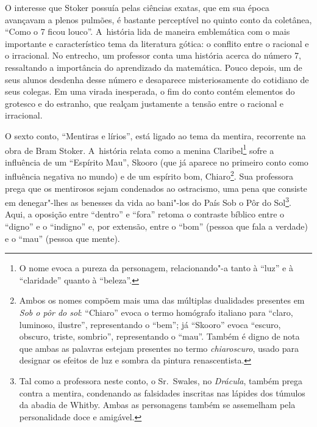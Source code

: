 O interesse que Stoker possuía pelas ciências exatas, que em sua época
avançavam a plenos pulmões, é bastante perceptível no quinto conto da
coletânea, ``Como o 7 ficou louco''. A~história lida de maneira
emblemática com o mais importante e característico tema da literatura
gótica: o conflito entre o racional e o irracional. No entrecho, um
professor conta uma história acerca do número 7, ressaltando a
importância do aprendizado da matemática. Pouco depois, um de seus
alunos desdenha desse número e desaparece misteriosamente do cotidiano
de seus colegas. Em uma virada inesperada, o fim do conto contém
elementos do grotesco e do estranho, que realçam justamente a tensão
entre o racional e irracional.

O sexto conto, ``Mentiras e lírios'', está ligado ao tema da mentira,
recorrente na obra de Bram Stoker. A~história relata como a menina
Claribel\footnote{O nome evoca a pureza da personagem,
relacionando"-a tanto à ``luz'' e à ``claridade'' quanto à ``beleza''.} sofre a influência de um ``Espírito
Mau'', Skooro (que já aparece no primeiro conto como influência negativa
no mundo) e de um espírito bom, Chiaro\footnote{Ambos os nomes compõem mais uma das
múltiplas dualidades presentes em \emph{Sob o pôr do sol}: ``Chiaro''
evoca o termo homógrafo italiano para ``claro, luminoso, ilustre'',
representando o ``bem''; já ``Skooro'' evoca ``escuro, obscuro, triste,
sombrio'', representando o ``mau''. Também é digno de nota que ambas as
palavras estejam presentes no termo \emph{chiaroscuro}, usado para
designar os efeitos de luz e sombra da pintura renascentista.}. Sua
professora prega que os mentirosos sejam condenados ao ostracismo, uma
pena que consiste em denegar"-lhes as benesses da vida ao bani"-los do
País Sob o Pôr do Sol\footnote{Tal como a professora neste conto, o Sr.~Swales, no \emph{Drácula}, também prega contra a mentira, condenando as
falsidades inscritas nas lápides dos túmulos da abadia de Whitby. Ambas
as personagens também se assemelham pela personalidade doce e amigável.}. Aqui, a oposição entre
``dentro'' e ``fora'' retoma o contraste bíblico entre o ``digno'' e o
``indigno'' e, por extensão, entre o ``bom'' (pessoa que fala a verdade)
e o ``mau'' (pessoa que mente).

